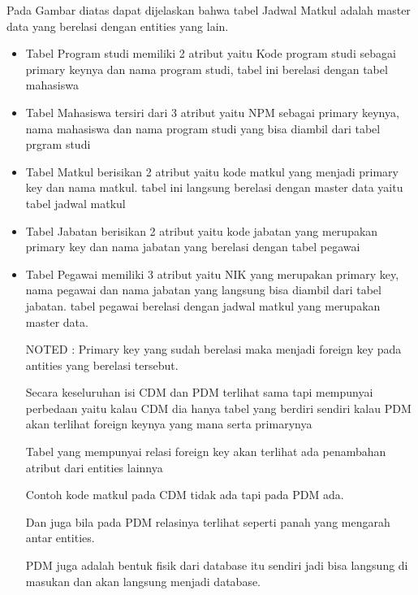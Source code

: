\documentclass[12pt]{article}
\begin{document}
Pada Gambar diatas dapat dijelaskan bahwa tabel Jadwal Matkul adalah master data yang berelasi dengan entities yang lain.
\begin{itemize}
  \item Tabel Program studi memiliki 2 atribut yaitu Kode program studi sebagai primary keynya dan nama program studi, tabel ini berelasi dengan tabel mahasiswa
  \item Tabel Mahasiswa tersiri dari 3 atribut yaitu NPM sebagai primary keynya, nama mahasiswa dan nama program studi yang bisa diambil dari tabel prgram studi
  \item Tabel Matkul berisikan 2 atribut yaitu kode matkul yang menjadi primary key dan nama matkul. tabel ini langsung berelasi dengan master data yaitu tabel jadwal matkul
  \item Tabel Jabatan berisikan 2 atribut yaitu kode jabatan yang merupakan primary key dan nama jabatan yang berelasi dengan tabel pegawai
  \item Tabel Pegawai memiliki 3 atribut yaitu NIK yang merupakan primary key, nama pegawai dan nama jabatan yang langsung bisa diambil dari tabel jabatan. tabel pegawai berelasi dengan jadwal matkul yang merupakan master data.
  
  NOTED : Primary key yang sudah berelasi maka menjadi foreign key pada antities yang berelasi tersebut.
        \hspace*{3cm}

Secara keseluruhan isi CDM dan PDM terlihat sama tapi mempunyai perbedaan yaitu kalau CDM dia hanya tabel yang berdiri sendiri kalau PDM akan terlihat foreign keynya yang mana serta primarynya 

Tabel yang mempunyai relasi foreign key akan terlihat ada penambahan atribut dari entities lainnya

Contoh kode matkul pada CDM tidak ada tapi pada PDM ada.

Dan juga bila pada PDM relasinya terlihat seperti panah yang mengarah antar entities.

PDM juga adalah bentuk fisik dari database itu sendiri jadi bisa langsung di masukan dan akan langsung menjadi database.
\end{itemize}
\end{document}

